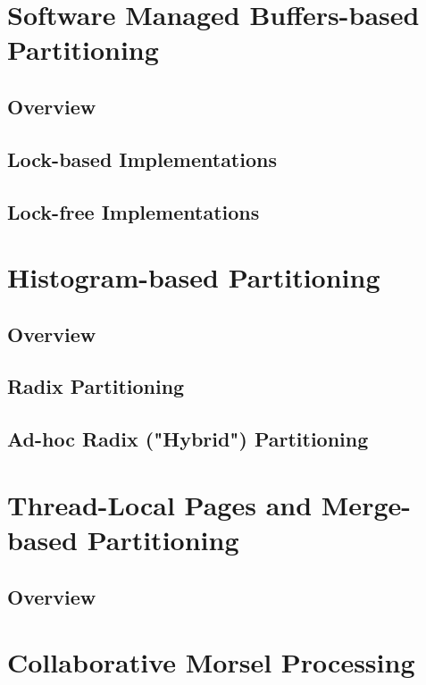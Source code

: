 
\section{Software Managed Buffers-based Partitioning}
\subsection{Overview}
\subsection{Lock-based Implementations}
\subsection{Lock-free Implementations}

\section{Histogram-based Partitioning}
\subsection{Overview}
\subsection{Radix Partitioning}
\subsection{Ad-hoc Radix ("Hybrid") Partitioning}

\section{Thread-Local Pages and Merge-based Partitioning}
\subsection{Overview}

\section{Collaborative Morsel Processing}
